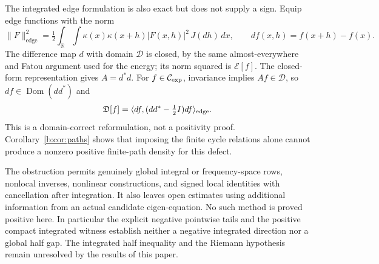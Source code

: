 \documentclass[11pt,a4paper]{article}
\numberwithin{equation}{section}
\theoremstyle{definition}\newtheorem{definition}[theorem]{Definition}
\theoremstyle{remark}\newtheorem{remark}[theorem]{Remark}
\newcommand{\R}{\mathbb R}\newcommand{\C}{\mathbb C}\newcommand{\N}{\mathbb N}
\newcommand{\E}{\mathcal E}\newcommand{\D}{\mathcal D}
\newcommand{\dom}{\operatorname{Dom}}\newcommand{\Var}{\operatorname{Var}}
\newcommand{\ip}[2]{\langle#1,#2\rangle}\newcommand{\norm}[1]{\lVert#1\rVert}\newcommand{\abs}[1]{\lvert#1\rvert}
\begin{document}
The integrated edge formulation is also exact but does not supply a sign. Equip edge functions with the norm
\[
 \norm F_{\mathrm{edge}}^2=\tfrac12\int_\R\int
     \kappa(x)\kappa(x+h)|F(x,h)|^2\,J(dh)\,dx,
 \qquad df(x,h)=f(x+h)-f(x).
\]
The difference map $d$ with domain $\D$ is closed, by the same almost-everywhere and Fatou argument used for the energy; its norm squared is $\E[f]$. The closed-form representation gives $A=d^*d$. For $f\in\mathcal C_{\exp}$, invariance implies $Af\in\D$, so $df\in\dom(dd^*)$ and
\begin{equation}\label{b:eq:edge-defect}
 \Def[f]=\ip{df}{(dd^*-\tfrac12I)df}_{\mathrm{edge}}.
\end{equation}
This is a domain-correct reformulation, not a positivity proof. Corollary~\ref{b:cor:paths} shows that imposing the finite cycle relations alone cannot produce a nonzero positive finite-path density for this defect.

The obstruction permits genuinely global integral or frequency-space rows, nonlocal inverses, nonlinear constructions, and signed local identities with cancellation after integration. It also leaves open estimates using additional information from an actual candidate eigen-equation. No such method is proved positive here. In particular the explicit negative pointwise tails and the positive compact integrated witness establish neither a negative integrated direction nor a global half gap. The integrated half inequality and the Riemann hypothesis remain unresolved by the results of this paper.
\end{document}

